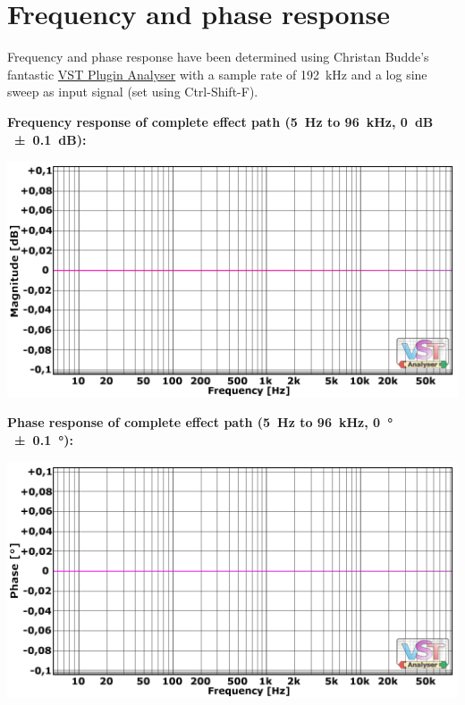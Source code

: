 \section{Frequency and phase response}

Frequency and phase response have been determined using Christan
Budde's fantastic
\href{http://www.pcjv.de/applications/measurement-programs/}{VST
  Plugin Analyser} with a sample rate of \SI{192}{\kilo\hertz} and a
log sine sweep as input signal (set using Ctrl-Shift-F).

\newpage %

\textbf{Frequency response of complete effect path (\SI{5}{\hertz} to
  \SI{96}{\kilo\hertz}, \SI{0}{\dB} \SI{\pm 0.1}{\dB}):}

\begin{center}
  \includegraphics[scale=0.60,clip]{include/images/fft_192khz-freq-fx_path.png}
\end{center}

\textbf{Phase response of complete effect path (\SI{5}{\hertz} to
  \SI{96}{\kilo\hertz}, \SI{0}{\degree}\,\SI{\pm 0.1}{\degree}):}

\begin{center}

\includegraphics[scale=0.60,clip]{include/images/fft_192khz-phase-fx_path.png}
\end{center}

